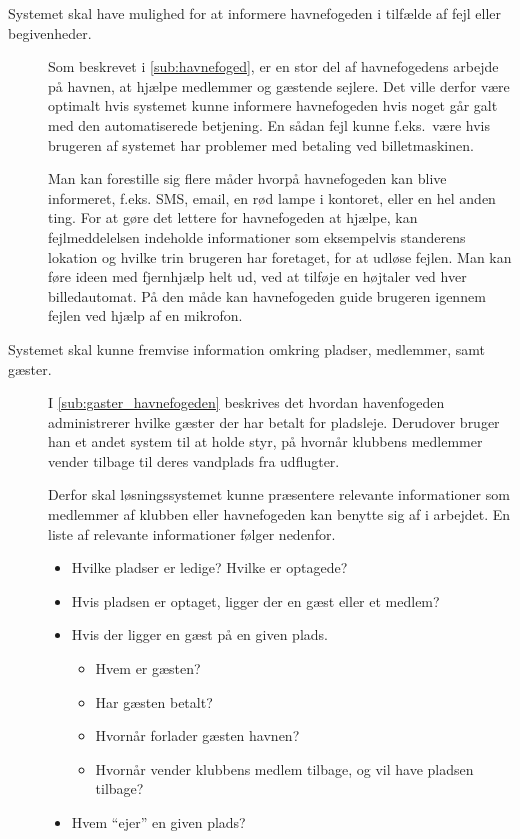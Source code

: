 \begin{description}
  \item[Systemet skal have mulighed for at informere havnefogeden i tilfælde af fejl eller begivenheder.]

  Som beskrevet i \cref{sub:havnefoged}, er en stor del af havnefogedens arbejde på havnen, at hjælpe medlemmer og gæstende sejlere. Det ville derfor være optimalt hvis systemet kunne informere havnefogeden hvis noget går galt med den automatiserede betjening. En sådan fejl kunne f.eks.\ være hvis brugeren af systemet har problemer med betaling ved billetmaskinen.

  Man kan forestille sig flere måder hvorpå havnefogeden kan blive informeret, f.eks. SMS, email, en rød lampe i kontoret, eller en hel anden ting. For at gøre det lettere for havnefogeden at hjælpe, kan fejlmeddelelsen indeholde informationer som eksempelvis standerens lokation og hvilke trin brugeren har foretaget, for at udløse fejlen. Man kan føre ideen med fjernhjælp helt ud, ved at tilføje en højtaler ved hver billedautomat. På den måde kan havnefogeden guide brugeren igennem fejlen ved hjælp af en mikrofon.


  \item[Systemet skal kunne fremvise information omkring pladser, medlemmer, samt gæster.]

  I \cref{sub:gaster_havnefogeden} beskrives det hvordan havenfogeden administrerer hvilke gæster der har betalt for pladsleje. Derudover bruger han et andet system til at holde styr, på hvornår klubbens medlemmer vender tilbage til deres vandplads fra udflugter.

  Derfor skal løsningssystemet kunne præsentere relevante informationer som medlemmer af klubben eller havnefogeden kan benytte sig af i arbejdet. En liste af relevante informationer følger nedenfor.


  \begin{itemize}
  \item Hvilke pladser er ledige? Hvilke er optagede?
  \item Hvis pladsen er optaget, ligger der en gæst eller et medlem?
  \item Hvis der ligger en gæst på en given plads.
    \begin{itemize}
      \item Hvem er gæsten?
      \item Har gæsten betalt?
      \item Hvornår forlader gæsten havnen?
      \item Hvornår vender klubbens medlem tilbage, og vil have pladsen tilbage?
    \end{itemize}
  \item Hvem \enquote{ejer} en given plads?
  \end{itemize}

\end{description}
